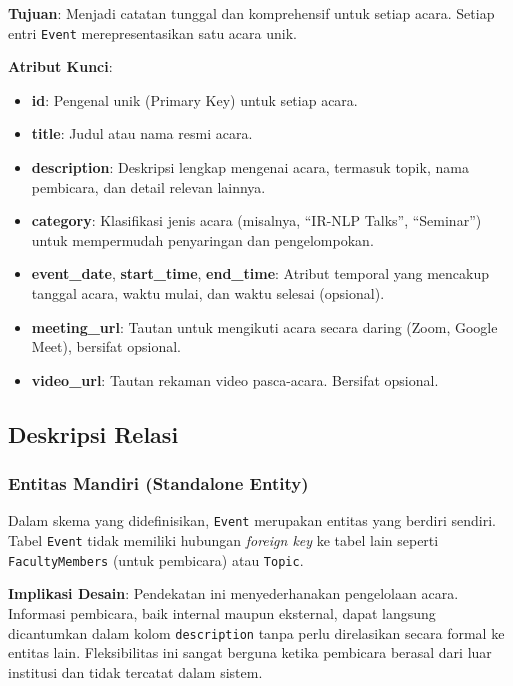 \textbf{Tujuan}: Menjadi catatan tunggal dan komprehensif untuk setiap acara. 
Setiap entri \texttt{Event} merepresentasikan satu acara unik.

\textbf{Atribut Kunci}:
\begin{itemize}
    \item \textbf{id}: Pengenal unik (Primary Key) untuk setiap acara.
    \item \textbf{title}: Judul atau nama resmi acara.
    \item \textbf{description}: Deskripsi lengkap mengenai acara, termasuk topik, nama pembicara, 
    dan detail relevan lainnya.
    \item \textbf{category}: Klasifikasi jenis acara (misalnya, ``IR-NLP Talks'', ``Seminar'') 
    untuk mempermudah penyaringan dan pengelompokan.
    \item \textbf{event\_date}, \textbf{start\_time}, \textbf{end\_time}: 
    Atribut temporal yang mencakup tanggal acara, waktu mulai, dan waktu selesai (opsional).
    \item \textbf{meeting\_url}: Tautan untuk mengikuti acara secara daring (Zoom, Google Meet), bersifat opsional.
    \item \textbf{video\_url}: Tautan rekaman video pasca-acara. Bersifat opsional.
\end{itemize}


\subsection{Deskripsi Relasi}

\subsubsection{Entitas Mandiri (Standalone Entity)}

Dalam skema yang didefinisikan, \texttt{Event} merupakan entitas yang berdiri sendiri. 
Tabel \texttt{Event} tidak memiliki hubungan \textit{foreign key} ke tabel lain seperti 
\texttt{FacultyMembers} (untuk pembicara) atau \texttt{Topic}.

\textbf{Implikasi Desain}:
Pendekatan ini menyederhanakan pengelolaan acara. Informasi pembicara, baik internal maupun 
eksternal, dapat langsung dicantumkan dalam kolom \texttt{description} tanpa perlu direlasikan 
secara formal ke entitas lain. Fleksibilitas ini sangat berguna ketika pembicara berasal dari 
luar institusi dan tidak tercatat dalam sistem.

